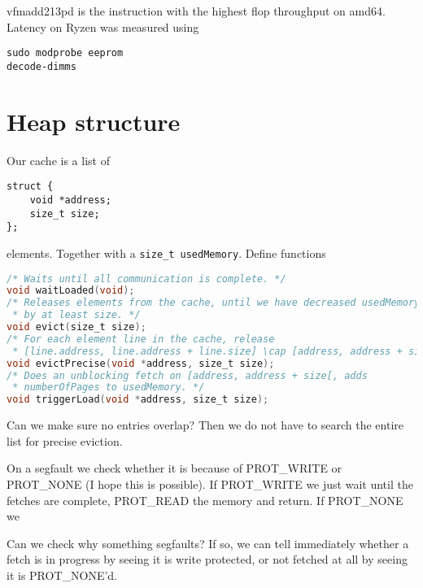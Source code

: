 \documentclass{article}
\begin{document}
vfmadd213pd is the instruction with the highest flop throughput on amd64. Latency on Ryzen was measured using

\begin{lstlisting}
sudo modprobe eeprom 
decode-dimms
\end{lstlisting}

\section{Heap structure}

Our cache is a list of

\begin{lstlisting}
struct {
    void *address;
    size_t size;
};
\end{lstlisting}

elements. Together with a \texttt{size\_t usedMemory}. Define functions

\begin{lstlisting}[language=C]
/* Waits until all communication is complete. */
void waitLoaded(void);
/* Releases elements from the cache, until we have decreased usedMemory 
 * by at least size. */
void evict(size_t size);
/* For each element line in the cache, release 
 * [line.address, line.address + line.size] \cap [address, address + size] */
void evictPrecise(void *address, size_t size); 
/* Does an unblocking fetch on [address, address + size[, adds 
 * numberOfPages to usedMemory. */
void triggerLoad(void *address, size_t size);
\end{lstlisting}

Can we make sure no entries overlap? Then we do not have to search the entire list for precise eviction. 

On a segfault we check whether it is because of PROT\_WRITE or PROT\_NONE (I hope this is possible). If PROT\_WRITE we just wait until the fetches are complete, PROT\_READ the memory and return. If PROT\_NONE we 

Can we check why something segfaults? If so, we can tell immediately whether a fetch is in progress by seeing it is
write protected, or not fetched at all by seeing it is PROT\_NONE'd.  



\end{document}
